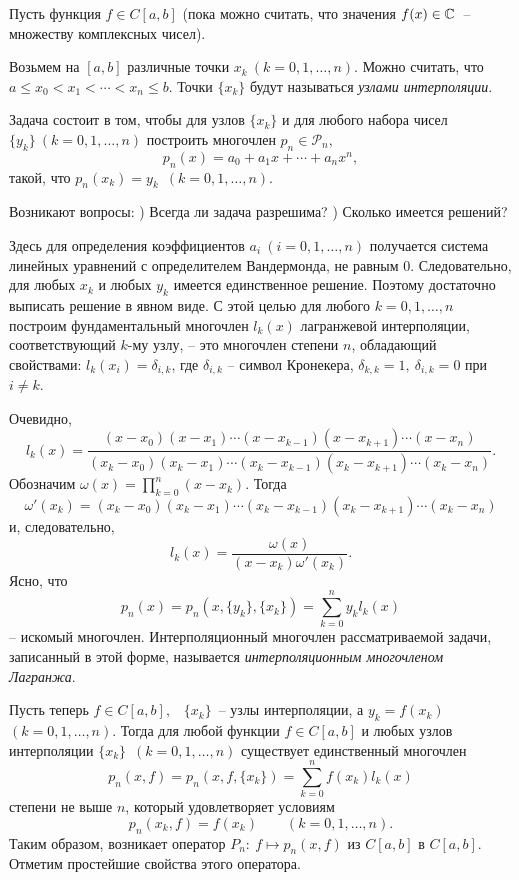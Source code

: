 Пусть функция $f \in C[a,b]$ (пока можно считать, что значения $f(x) \in \mathbb{C}$~--
множеству комплексных чисел).

Возьмем на $[a,b]$ {различные точки} $x_k\ (k=0,1,\ldots,n)$. Можно считать, что
$a \le x_0 <x_1< \cdots <x_n \le b.$ Точки $\{x_k\}$ будут называться {\it узлами
интерполяции}.

Задача состоит в том, чтобы для узлов $\{x_k\}$ и для любого набора {чисел} $\{y_k\}\
(k=0,1,\dots ,n)$ построить многочлен $p_n \in \mathcal{P}_n,$
\[
  p_n(x)=a_0+a_1x+\cdots +a_n x^n,
\]
такой, что $p_n(x_k)=y_k$\  $(k=0,1,\dots ,n).$

Возникают вопросы:
) Всегда ли задача разрешима?
) Сколько имеется решений?
\smallskip

Здесь для определения коэффициентов $a_i\ (i=0,1,\dots,n)$ получается система линейных
уравнений с определителем Вандермонда, не равным $0.$ Следовательно, для любых $x_k$ и
любых $y_k$ имеется единственное решение. Поэтому достаточно {выписать} решение в
явном виде. {С этой целью для} любого $k=0,1,\dots,n$ построим фундаментальный
многочлен {$l_k(x)$} лагранжевой интерполяции, соответствующий $k$-му узлу, -- это
многочлен степени $n$, обладающий свойствами: $l_k(x_i)=\delta_{i,k}$, где
$\delta_{i,k}$ -- символ Кронекера, $\delta_{k,k}=1, \ \delta_{i,k}=0$ при $i \ne k$.

Очевидно,
\[
  l_k(x)=\frac{(x-x_0)(x-x_1)\cdots (x-x_{k-1})(x-x_{k+1})\cdots (x-x_n)}
         {(x_k-x_0)(x_k-x_1)\cdots (x_k-x_{k-1})(x_k-x_{k+1})\cdots (x_k-x_n)}.
\]
Обозначим $\omega(x)=\prod_{k=0}^n(x-x_k).$
Тогда
$$
\omega'(x_k)=
      (x_k-x_0)(x_k-x_1)\cdots (x_k-x_{k-1})(x_k-x_{k+1})\cdots (x_k-x_n)
$$
и, следовательно,
\[
 l_k(x)=\frac{\omega(x)}{(x-x_k)\omega'(x_k)}.
\]
Ясно, что
\[
 p_n(x)=p_{n}(x,\{y_k\},\{x_k\})=
 \sum\limits_{k=0}^n y_k l_k(x)
\]
-- искомый многочлен. Интерполяционный многочлен
рассматриваемой задачи, записанный в этой форме, называется {\it
интерполяционным многочленом Лагранжа}.

Пусть теперь $f \in C[a,b],$~ $\{x_k\}$~-- узлы интерполяции, а $y_k=f(x_k)$\
$(k=0,1,\dots ,n).$ Тогда для любой функции $f \in C[a,b]$ и любых узлов
{интерполяции} $\{x_k\}$\  $(k=0,1,\dots ,n)$ существует единственный многочлен
$$
p_n(x,f)=p_n(x,f,\{x_k\})=\sum\limits_{k=0}^n f(x_k) l_k(x)
$$
степени не выше $n$, который удовлетворяет условиям
\[
 p_n(x_k,f)=f(x_k)\qquad (k=0,1,\dots ,n).
\]
Таким образом, возникает {оператор} $P_n:\ f \longmapsto p_n(x,f)$ {из} $C{[a,
b]}$ в $C{[a,b]}$. {Отметим} простейшие свойства {этого оператора.}

